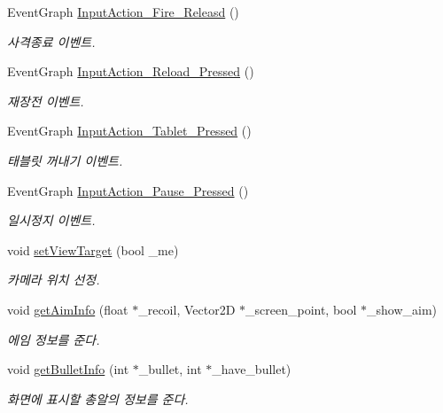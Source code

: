 \begin{DoxyCompactItemize}
Event\+Graph \hyperlink{class_player___person_afbf8372d9b3f256e0a55507ed88bcac9}{Input\+Action\+\_\+\+Fire\+\_\+\+Releasd} ()
\begin{DoxyCompactList}\small\item\em 사격종료 이벤트. \end{DoxyCompactList}\item 
Event\+Graph \hyperlink{class_player___person_a44841a3a300d9ead0ae1a38f5f4701aa}{Input\+Action\+\_\+\+Reload\+\_\+\+Pressed} ()
\begin{DoxyCompactList}\small\item\em 재장전 이벤트. \end{DoxyCompactList}\item 
Event\+Graph \hyperlink{class_player___person_a8c8dc86d7b6fa1fd26db5bbb035d84c3}{Input\+Action\+\_\+\+Tablet\+\_\+\+Pressed} ()
\begin{DoxyCompactList}\small\item\em 태블릿 꺼내기 이벤트. \end{DoxyCompactList}\item 
Event\+Graph \hyperlink{class_player___person_a4df97a9a6657eae7f0831a79498444a5}{Input\+Action\+\_\+\+Pause\+\_\+\+Pressed} ()
\begin{DoxyCompactList}\small\item\em 일시정지 이벤트. \end{DoxyCompactList}\item 
void \hyperlink{class_player___person_a2719b6d6bb77d38be7cf5e5f677ade24}{set\+View\+Target} (bool \+\_\+me)
\begin{DoxyCompactList}\small\item\em 카메라 위치 선정. \end{DoxyCompactList}\item 
void \hyperlink{class_player___person_a9d2fb283896181096721f63cca4fbaf1}{get\+Aim\+Info} (float $\ast$\+\_\+recoil, Vector2D $\ast$\+\_\+screen\+\_\+point, bool $\ast$\+\_\+show\+\_\+aim)
\begin{DoxyCompactList}\small\item\em 에임 정보를 준다. \end{DoxyCompactList}\item 
void \hyperlink{class_player___person_aab48e1eb2c70ac97cf6c5cee99e19b21}{get\+Bullet\+Info} (int $\ast$\+\_\+bullet, int $\ast$\+\_\+have\+\_\+bullet)
\begin{DoxyCompactList}\small\item\em 화면에 표시할 총알의 정보를 준다. \end{DoxyCompactList}\end{DoxyCompactItemize}
